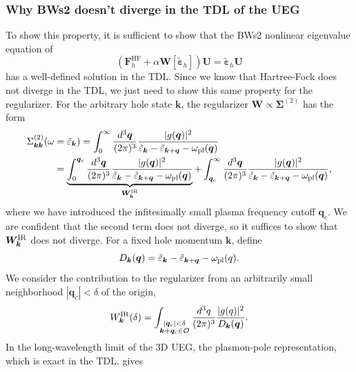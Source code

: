 \subsubsection{Why BWs2 doesn't diverge in the TDL of the UEG}
To show this property, it is sufficient to show that the BWs2 nonlinear eigenvalue equation of
\begin{equation}
    \left(\mathbf{F}_{h}^{\mathrm{HF}}+\alpha \mathbf{W}[\bm{\tilde{\varepsilon}}_h]\right) \bm{U} = \bm{\tilde{\varepsilon}}_h \bm{U}
\end{equation}
has a well-defined solution in the TDL.%
 Since we know that Hartree-Fock does not diverge in the TDL, we just need to show this same property for the regularizer. For the arbitrary hole state $\bm{k}$, the
 regularizer $\bm{W}\propto \bm{\Sigma}^{(2)}$ has the form
\begin{align}
\Sigma^{(2)}_{\bm{k}\bm{k}}(\omega&=\tilde{\varepsilon}_{\bm{k}}) = \int^{\infty}_0 \frac{d^3 \bm{q}}{(2 \pi)^3} \frac{|g(\bm{q})|^2}{\tilde{\varepsilon}_{\bm{k}}-\tilde{\varepsilon}_{\bm{k}+\bm{q}}-\omega_{\mathrm{pl}}(\bm{q})}\\
&=\underbrace{\int^{\bm{q}_c}_{0} \frac{d^3 \bm{q}}{(2 \pi)^3} \frac{|g(\bm{q})|^2}{\tilde{\varepsilon}_{\bm{k}}-\tilde{\varepsilon}_{\bm{k}+\bm{q}}-\omega_{\mathrm{pl}}(\bm{q})}}_{\bm{W}_{\bm{k}}^{\rm IR}}+\int^{\infty}_{\bm{q}_c} \frac{d^3 \bm{q}}{(2 \pi)^3} \frac{|g(\bm{q})|^2}{\tilde{\varepsilon}_{\bm{k}}-\tilde{\varepsilon}_{\bm{k}+\bm{q}}-\omega_{\mathrm{pl}}(\bm{q})},
\label{eq:W_regularizer}
\end{align} where we have introduced the infitesimally small plasma frequency cutoff $\bm{q}_c$. We are confident that the second term does not diverge, so it suffices to show that $\bm{W}_{\bm{k}}^{\rm IR}$ does not diverge.
For a fixed hole momentum $\bm k$, define
\begin{equation}
D_{\bm k}(\bm q)
=
\tilde{\varepsilon}_{\bm k}
-
\tilde{\varepsilon}_{\bm{k}+\bm q}
-
\omega_{\rm pl}(q).
\end{equation}
We consider the contribution to the regularizer from an arbitrarily
small neighborhood $|\bm{q}_c|<\delta$ of the origin,
\begin{equation}
W_{\bm k}^{\rm IR}(\delta)
=
\int_{\substack{|\bm q_c|<\delta\\
\bm{k}+\bm q_c\in\mathcal O}}
\frac{d^3q}{(2\pi)^3}
\frac{|g(q)|^2}{D_{\bm k}(\bm q)}.
\end{equation}
In the long-wavelength limit of the 3D UEG,
the plasmon-pole representation, which is exact in the TDL, gives
